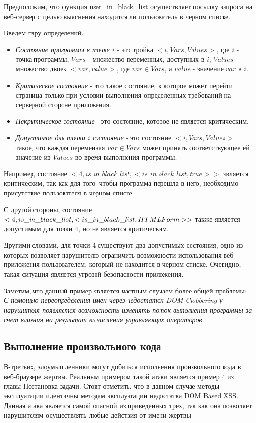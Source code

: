 Предположим, что функция user\_in\_black\_list осуществляет посылку запроса на веб-сервер с целью выяснения находится ли пользователь в черном списке.


Введем пару определений:
\begin{itemize}
	\item \textit{Состояние программы в точке $i$} - это тройка $<i, Vars, Values>$, где $i$ - точка программы, $Vars$ - множество переменных, доступных в $i$, $Values$ - множество двоек $<var, value>$, где $var \in Vars$, а $value$ - значение $var$ в $i$.  
	\item \textit{Критическое состояние} - это такое состояние, в которое может перейти страница только при условии выполнения определенных требований на серверной стороне приложения.
	\item \textit{Некритическое состояние} - это состояние, которое не является критическим.
	\item \textit{Допустимое для точки $i$ состояние} - это состояние $<i, Vars, Values>$ такое, что каждая переменная $var \in Vars$ может принять соответствующее ей значение из $Values$ во время выполнения программы.
\end{itemize}


Например, состояние $<4, is\_in\_black\_list , <is\_in\_black\_list, true>>$ является критическим, так как для того, чтобы программа перешла в него, необходимо присутствие пользователя в черном списке.

\bigskip
С другой стороны, состояние $<4, is\_in\_black\_list, <is\_in\_black\_list, \\HTMLForm>>$  также является допустимым для точки 4, но не является критическим.
\bigskip

Другими словами, для точки 4 существуют два допустимых состояния, одно из которых позволяет нарушителю ограничить возможности использования веб-приложения пользователем, который не находится в черном списке. Очевидно, такая ситуация является угрозой безопасности приложения.


Заметим, что данный пример является частным случаем более общей проблемы: \textit{С помощью переопределения имен через недостаток DOM Clobbering у нарушителя появляется возможность изменять поток выполнения программы за счет влияния на результат вычисления управляющих операторов}.

\subsection{Выполнение произвольного кода}
В-третьих, злоумышленники могут добиться исполнения произвольного кода в веб-браузере жертвы. Реальным примером такой атаки является пример 4 из главы Постановка задачи. Стоит отметить, что в данном случае методы эксплуатации идентичны методам эксплуатации недостатка DOM Based XSS. Данная атака является самой опасной из приведенных трех, так как она позволяет нарушителям осуществлять любые действия от имени жертвы.

